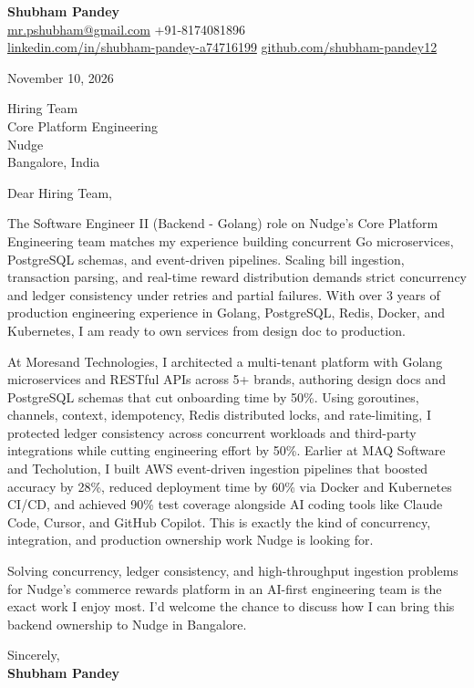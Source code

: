 \documentclass[a4paper,11pt]{article}
\begin{document}
\textbf{\Large Shubham Pandey}\\
\href{mailto:mr.pshubham@gmail.com}{mr.pshubham@gmail.com} \quad +91-8174081896\\
\href{https://www.linkedin.com/in/shubham-pandey-a74716199/}{linkedin.com/in/shubham-pandey-a74716199} \quad
\href{https://github.com/shubham-pandey12}{github.com/shubham-pandey12}

\vspace{1em}
November 10, 2026

\vspace{1em}
Hiring Team\\
Core Platform Engineering\\
Nudge\\
Bangalore, India

\vspace{1em}
Dear Hiring Team,

The Software Engineer II (Backend - Golang) role on Nudge's Core Platform Engineering team matches my experience building concurrent Go microservices, PostgreSQL schemas, and event-driven pipelines. Scaling bill ingestion, transaction parsing, and real-time reward distribution demands strict concurrency and ledger consistency under retries and partial failures. With over 3 years of production engineering experience in Golang, PostgreSQL, Redis, Docker, and Kubernetes, I am ready to own services from design doc to production.

At Moresand Technologies, I architected a multi-tenant platform with Golang microservices and RESTful APIs across 5+ brands, authoring design docs and PostgreSQL schemas that cut onboarding time by 50\%. Using goroutines, channels, context, idempotency, Redis distributed locks, and rate-limiting, I protected ledger consistency across concurrent workloads and third-party integrations while cutting engineering effort by 50\%. Earlier at MAQ Software and Techolution, I built AWS event-driven ingestion pipelines that boosted accuracy by 28\%, reduced deployment time by 60\% via Docker and Kubernetes CI/CD, and achieved 90\% test coverage alongside AI coding tools like Claude Code, Cursor, and GitHub Copilot. This is exactly the kind of concurrency, integration, and production ownership work Nudge is looking for.

Solving concurrency, ledger consistency, and high-throughput ingestion problems for Nudge's commerce rewards platform in an AI-first engineering team is the exact work I enjoy most. I'd welcome the chance to discuss how I can bring this backend ownership to Nudge in Bangalore.

\vspace{1em}
Sincerely,\\[0.5em]
\textbf{Shubham Pandey}
\end{document}
